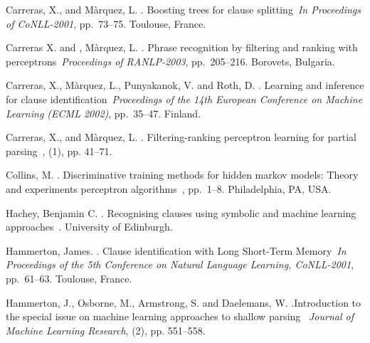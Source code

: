 \documentclass[english]{jnlp_1.4}
\begin{document}
{\begin{thebibliography}{}
Carreras, X., and M\`{a}rquez, L. \BBCP.
\newblock \BBOQ Boosting trees for clause
splitting\BBCQ\ \newblock \textit{In Proceedings of CoNLL-2001},
pp.~73--75. Toulouse, France.

\newblock Carreras X. and , M\`{a}rquez, L. \BBCP.
\newblock \BBOQ Phrase recognition by filtering
and ranking with perceptrons\BBCQ\ \newblock \textit{Proceedings of
RANLP-2003}, pp.~205--216. Borovets, Bulgaria.


Carreras, X., M\`{a}rquez, L., Punyakanok, V. and Roth, D. \BBCP. \newblock \BBOQ Learning and inference for clause
identification\BBCQ\ \newblock \emph{Proceedings of the 14th
European Conference on Machine Learning (ECML 2002)}, pp.~35--47.
Finland.

Carreras, X., and M\`{a}rquez, L. \BBCP. \newblock \BBOQ
Filtering-ranking perceptron learning for partial parsing\BBCQ\
, {\/} (1), pp. 41--71.

Collins, M. \BBCP. \newblock \BBOQ Discriminative training
methods for hidden markov models: Theory and experiments perceptron
algorithms\BBCQ\ \newblock {\em Proceeding EMNLP-02}, pp.~1--8.
Philadelphia, PA, USA.

Hachey, Benjamin C. \BBCP. \newblock \BBOQ Recognising
clauses using symbolic and machine learning approaches\BBCQ\
. University of Edinburgh.



Hammerton, James. \BBCP.
\newblock \BBOQ Clause identification with Long Short-Term Memory\BBCQ\
\newblock \emph{In Proceedings of the 5th Conference on Natural Language Learning, CoNLL-2001},
pp.~61--63. Toulouse, France.



Hammerton, J., Osborne, M., Armstrong, S. and Daelemans, W. \BBCP.\newblock \BBOQ Introduction to the special issue on
machine learning approaches to shallow parsing\BBCQ\ \newblock
\textit{Journal of Machine Learning Research}, (2), pp. 551--558.



\end{thebibliography}}
\end{document}
